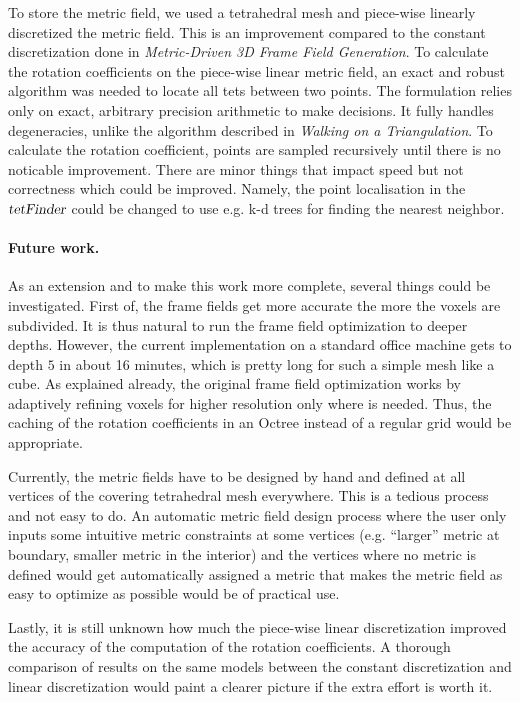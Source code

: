 \documentclass[a4paper,twoside,openright,11pt]{report}
\newcommand{\op}[1]{\textsl{#1}}
\begin{document}
To store the metric field, we used a tetrahedral mesh and piece-wise
linearly discretized the metric field. This is an improvement compared
to the constant discretization done in \emph{Metric-Driven 3D Frame Field Generation}\cite{Fang23}.
To calculate the rotation coefficients on the piece-wise linear metric field,
an exact and robust algorithm was needed to locate all tets between two points.
The formulation relies only on exact, arbitrary precision arithmetic to make decisions.
It fully handles degeneracies, unlike the algorithm described in \emph{Walking on a Triangulation}\cite{Devillers}.
To calculate the rotation coefficient, points are sampled recursively
until there is no noticable improvement.
There are minor things that impact speed but not
correctness which could be improved. Namely, the point localisation
in the $\op{tetFinder}$ could be changed to use e.g. k-d trees for
finding the nearest neighbor.


\paragraph{Future work.}
As an extension and to make this work more complete, several things
could be investigated.
First of, the frame fields get more accurate the more the voxels are
subdivided. It is thus natural to run the frame field optimization to
deeper depths. However, the current implementation on a standard office machine gets to depth $5$ in about 16 minutes,
which is pretty long for such a simple mesh like a cube.
As explained already, the original frame field optimization works by
adaptively refining voxels for higher resolution only where is needed.
Thus, the caching of the rotation coefficients in an Octree instead of 
a regular grid would be appropriate.

Currently, the metric fields have to be designed by hand and defined at
all vertices of the covering tetrahedral mesh everywhere.
This is a tedious process and not easy to do.
An automatic metric field design process where the user only inputs some
intuitive metric constraints at some vertices (e.g. ``larger'' metric at boundary, smaller metric
in the interior) and the vertices where no metric is defined would get
automatically assigned a metric that makes the metric field as easy to
optimize as possible would be of practical use.

Lastly, it is still unknown how much the piece-wise linear
discretization improved the accuracy of the computation of the rotation
coefficients.
A thorough comparison of results on the same models between the
constant discretization \cite{Fang23}
and linear discretization would paint a clearer picture if the extra
effort is worth it. 
\end{document}
